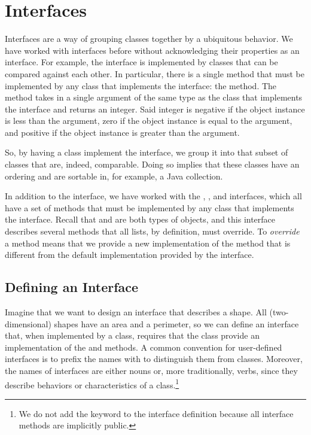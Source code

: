 \section{Interfaces}

Interfaces are a way of grouping classes together by a ubiquitous behavior. We have worked with interfaces before without acknowledging their properties as an interface. For example, the  interface is implemented by classes that can be compared against each other. In particular, there is a single method that must be implemented by any class that implements the  interface: the  method. The  method takes in a single argument of the same type as the class that implements the  interface and returns an integer. Said integer is negative if the object instance is less than the argument, zero if the object instance is equal to the argument, and positive if the object instance is greater than the argument.

So, by having a class implement the  interface, we group it into that subset of classes that are, indeed, comparable. Doing so implies that these classes have an ordering and are sortable in, for example, a Java collection. 

In addition to the  interface, we have worked with the , , and  interfaces, which all have a set of methods that must be implemented by any class that implements the interface. Recall that  and  are both types of  objects, and this interface describes several methods that all lists, by definition, must override. To \textit{override} a method means that we provide a new implementation of the method that is different from the default implementation provided by the interface.

\subsection*{Defining an Interface}
\example Imagine that we want to design an interface that describes a shape. All (two-dimensional) shapes have an area and a perimeter, so we can define an interface that, when implemented by a class, requires that the class provide an implementation of the  and  methods. A common convention for user-defined interfaces is to prefix the names with  to distinguish them from classes. Moreover, the names of interfaces are either nouns or, more traditionally, verbs, since they describe behaviors or characteristics of a class.\footnote{We do not add the  keyword to the interface definition because all interface methods are implicitly public.}

